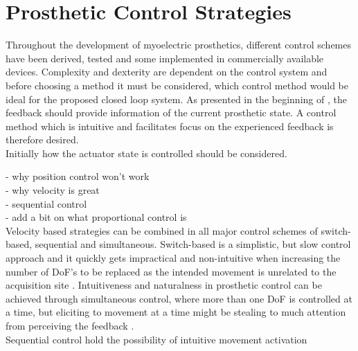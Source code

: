 \section{Prosthetic Control Strategies}

Throughout the development of myoelectric prosthetics, different control schemes have been derived, tested and some implemented in commercially available devices. Complexity and dexterity are dependent on the control system and before choosing a method it must be considered, which control method would be ideal for the proposed closed loop system. As presented in the beginning of , the feedback should provide information of the current prosthetic state. A control method which is intuitive and facilitates focus on the experienced feedback is therefore desired.\\
Initially how the actuator state is controlled should be considered.

- why position control won't work \\
- why velocity is great \\ 
- sequential control \\
- add a bit on what proportional control is \\

Velocity based strategies can be combined in all major control schemes of switch-based, sequential and simultaneous. Switch-based is a simplistic, but slow control approach and it quickly gets impractical and non-intuitive when increasing the number of DoF's to be replaced as the intended movement is unrelated to the acquisition site \cite{Wurth2014}. Intuitiveness and naturalness in prosthetic control can be achieved through simultaneous control, where more than one DoF is controlled at a time, but eliciting to movement at a time might be stealing to much attention from perceiving the feedback \cite{Farina2014}. \\
Sequential control hold the possibility of intuitive movement activation 
